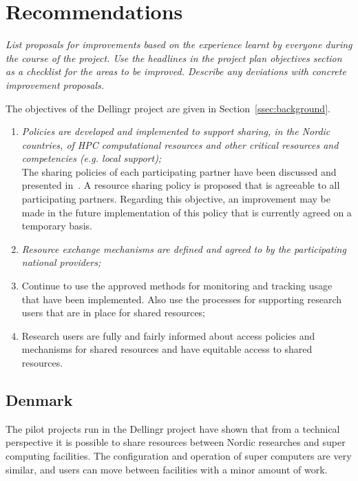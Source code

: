 \documentclass{article}
\newcommand{\dell}{Dellingr\xspace}
\begin{document}
\section{Recommendations}

{\it List proposals for improvements based on the experience learnt by everyone during the course of the project. Use the headlines in the project plan objectives section as a checklist for the areas to be improved. Describe any deviations with concrete improvement proposals.}


The objectives of the \dell project are given in Section~\ref{ssec:background}.

\begin{enumerate}
\item {\it Policies are developed and implemented to support sharing, in the Nordic countries, of HPC computational resources and other critical resources and competencies (e.g. local support);}\\
{
The sharing policies of each participating partner have been discussed and presented in~\cite{dellingr-p2-do5}.
A resource sharing policy is proposed that is agreeable to all participating partners.
Regarding this objective, an improvement may be made in the future implementation of this policy that is currently agreed on a temporary basis.
}

\item {\it Resource exchange mechanisms are defined and agreed to by the participating national providers;}
\item Continue to use the approved methods for monitoring and tracking usage that have been implemented. Also use the processes for supporting research users that are in place for shared resources;
\item Research users are fully and fairly informed about access policies and mechanisms for shared resources and have equitable 
access to shared resources.
\end{enumerate}

\subsection{Denmark}

The pilot projects run in the \dell project have shown that from a technical perspective it is possible to share resources between Nordic researches and super computing facilities. 
The configuration and operation of super computers are very similar, and users can move between facilities with a minor amount of work.
\end{document}
